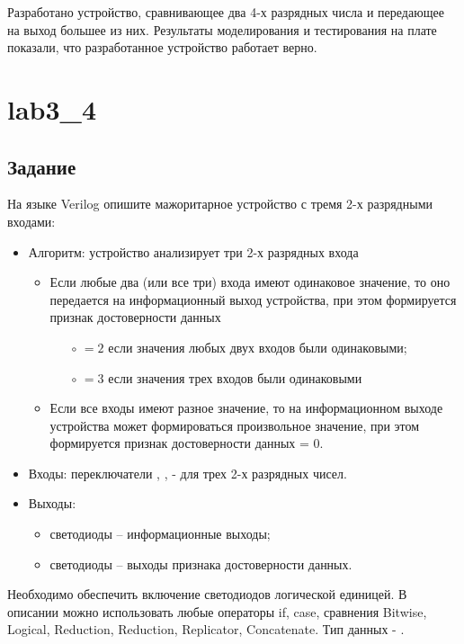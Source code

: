 Разработано устройство, сравнивающее два 4-х разрядных числа и передающее на выход большее из них. Результаты моделирования и тестирования на плате показали, что разработанное устройство работает верно.

\section{lab3\_4}

\subsection{Задание}

На языке Verilog опишите мажоритарное устройство с тремя 2-х разрядными входами:
\begin{itemize}
	\item Алгоритм: устройство анализирует три 2-х разрядных входа
		\begin{itemize}
			\item Если любые два (или все три) входа имеют одинаковое значение, то оно передается на информационный выход устройства, при этом формируется признак достоверности данных
				\begin{itemize}
					\item[$\circ$] $=2$ если значения любых двух входов были одинаковыми;
					\item[$\circ$] $=3$ если значения трех входов были одинаковыми
				\end{itemize}
			\item Если все входы имеют разное значение, то на информационном выходе устройства может формироваться произвольное значение, при этом формируется признак достоверности данных = 0.
		\end{itemize}
	\item Входы: переключатели , ,  - для трех 2-х разрядных чисел.
	\item Выходы:
		\begin{itemize}
			\item светодиоды  -- информационные выходы;
			\item светодиоды  -- выходы признака достоверности данных.
		\end{itemize}
\end{itemize}

Необходимо обеспечить включение светодиодов логической единицей. В описании можно использовать любые операторы if, case, сравнения Bitwise, Logical, Reduction, Reduction, Replicator, Concatenate. Тип данных - .

